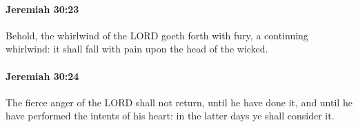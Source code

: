 		\paragraph{Jeremiah 30:23} %
			\label{JEREMIAH-30-23}

			Behold, the whirlwind of the LORD goeth forth with fury, a continuing whirlwind: it shall fall with pain upon the head of the wicked.


		\paragraph{Jeremiah 30:24} %
			\label{JEREMIAH-30-24}

			The fierce anger of the LORD shall not return, until he have done it, and until he have performed the intents of his heart: in the latter days ye shall consider it.

